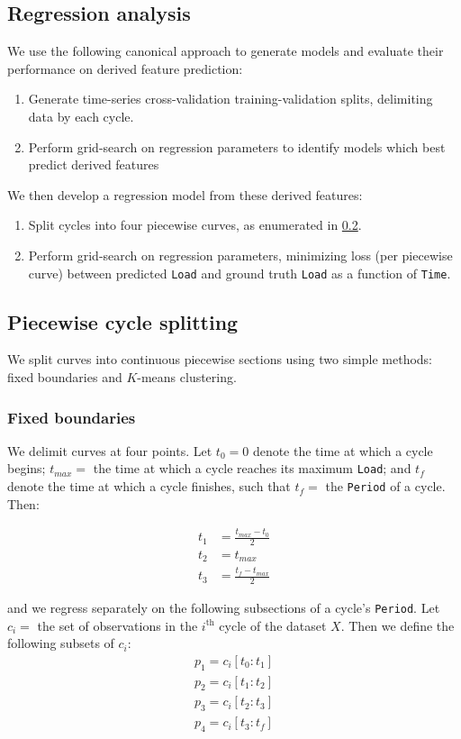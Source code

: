 \documentclass[letterpaper, 10 pt, conference]{ieeeconf}  %
\begin{document}
\subsection{Regression analysis}
We use the following canonical approach to generate models and evaluate their performance on derived feature prediction:
\begin{enumerate}
  \item Generate time-series cross-validation training-validation splits, delimiting data by each cycle.
  \item Perform grid-search on regression parameters to identify models which best predict derived features
\end{enumerate}

We then develop a regression model from these derived features:
\begin{enumerate}
  \item Split cycles into four piecewise curves, as enumerated in \ref{ssec:Piecewise}.
  \item Perform grid-search on regression parameters, minimizing loss (per piecewise curve) between predicted \verb|Load| and ground truth \verb|Load| as a function of \verb|Time|. 
\end{enumerate}

\subsection{Piecewise cycle splitting}\label{ssec:Piecewise}
We split curves into continuous piecewise sections using two simple methods: fixed boundaries and $K$-means clustering.

\subsubsection{Fixed boundaries}
We delimit curves at four points. Let $t_0 = 0$ denote the time at which a cycle begins; $t_{max} =$ the time at which a cycle reaches its maximum \verb|Load|; and $t_f$ denote the time at which a cycle finishes, such that $t_f =$ the \verb|Period| of a cycle. Then:

\begin{align*}
  t_1 &= \frac{t_{max} - t_0}{2} \\
  t_2 &= t_{max} \\
  t_3 &= \frac{t_f - t_{max}}{2}
\end{align*}

and we regress separately on the following subsections of a cycle's \verb|Period|. Let $c_i=$ the set of observations in the $i^{\text{th}}$ cycle of the dataset $X$. Then we define the following subsets of $c_i$:
\begin{align*}
  p_1 = c_i[t_0:t_1] \\
  p_2 = c_i[t_1:t_2] \\
  p_3 = c_i[t_2:t_3] \\
  p_4 = c_i[t_3:t_f]
\end{align*}
\end{document}
